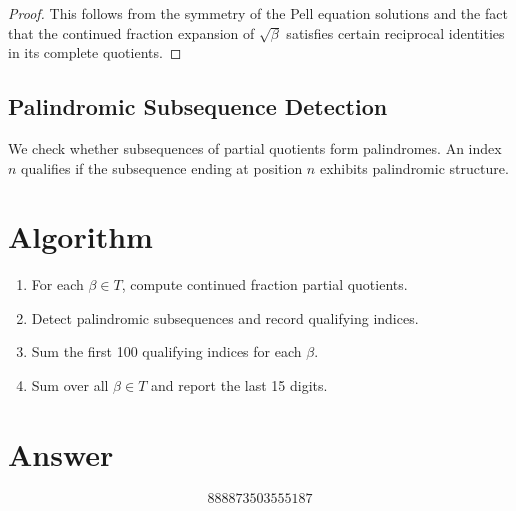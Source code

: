 \documentclass[12pt]{article}
\theoremstyle{definition}
\begin{document}
\begin{proof}
This follows from the symmetry of the Pell equation solutions and the fact that the continued fraction expansion of $\sqrt{\beta}$ satisfies certain reciprocal identities in its complete quotients.
\end{proof}

\subsection{Palindromic Subsequence Detection}

We check whether subsequences of partial quotients form palindromes. An index $n$ qualifies if the subsequence ending at position $n$ exhibits palindromic structure.

\section{Algorithm}

\begin{enumerate}
\item For each $\beta \in T$, compute continued fraction partial quotients.
\item Detect palindromic subsequences and record qualifying indices.
\item Sum the first 100 qualifying indices for each $\beta$.
\item Sum over all $\beta \in T$ and report the last 15 digits.
\end{enumerate}

\section{Answer}

\[
\boxed{888873503555187}
\]
\end{document}
